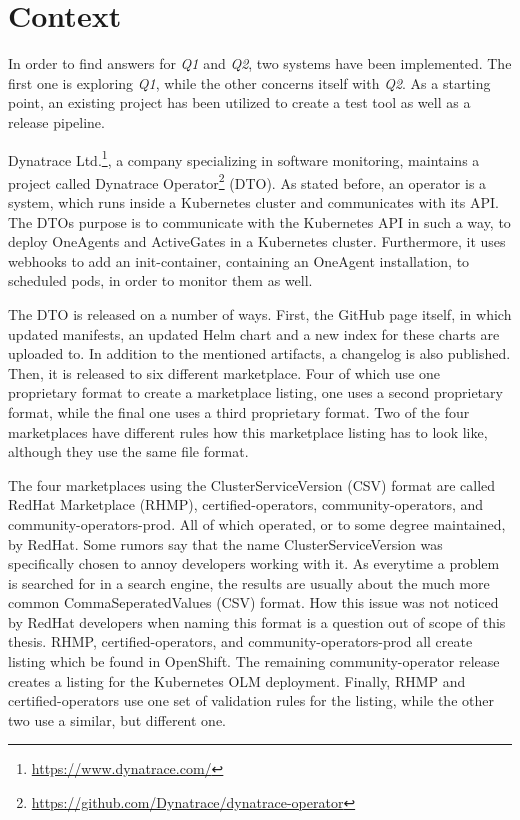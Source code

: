 \chapter{Context}\label{ch:context}

In order to find answers for \textit{Q1} and \textit{Q2}, two systems have been implemented.
The first one is exploring \textit{Q1}, while the other concerns itself with \textit{Q2}.
As a starting point, an existing project has been utilized to create a test tool as well as a release pipeline.

Dynatrace Ltd.\footnote{\url{https://www.dynatrace.com/}}, a company specializing in software monitoring, maintains a project called Dynatrace Operator\footnote{\url{https://github.com/Dynatrace/dynatrace-operator}} (DTO).
As stated before, an operator is a system, which runs inside a Kubernetes cluster and communicates with its API.
The DTOs purpose is to communicate with the Kubernetes API in such a way, to deploy OneAgents and ActiveGates in a Kubernetes cluster.
Furthermore, it uses webhooks to add an init-container, containing an OneAgent installation, to scheduled pods, in order to monitor them as well.

The DTO is released on a number of ways.
First, the GitHub page itself, in which updated manifests, an updated Helm chart and a new index for these charts are uploaded to.
In addition to the mentioned artifacts, a changelog is also published.
Then, it is released to six different marketplace.
Four of which use one proprietary format to create a marketplace listing, one uses a second proprietary format, while the final one uses a third proprietary format.
Two of the four marketplaces have different rules how this marketplace listing has to look like, although they use the same file format.

The four marketplaces using the ClusterServiceVersion (CSV) format are called RedHat Marketplace (RHMP), certified-operators, community-operators, and community-operators-prod.
All of which operated, or to some degree maintained, by RedHat.
Some rumors say that the name ClusterServiceVersion was specifically chosen to annoy developers working with it.
As everytime a problem is searched for in a search engine, the results are usually about the much more common CommaSeperatedValues (CSV) format.
How this issue was not noticed by RedHat developers when naming this format is a question out of scope of this thesis.
RHMP, certified-operators, and community-operators-prod all create listing which be found in OpenShift.
The remaining community-operator release creates a listing for the Kubernetes OLM deployment.
Finally, RHMP and certified-operators use one set of validation rules for the listing, while the other two use a similar, but different one.

